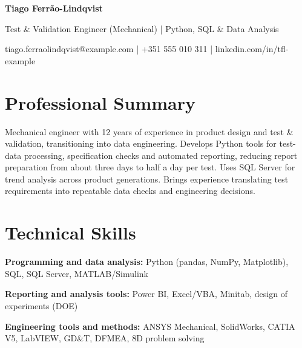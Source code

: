 \documentclass[11pt,a4paper]{article}
\newcommand{\cvsection}[1]{\section*{#1}}
\begin{document}
{\LARGE\bfseries\color{primarycolor} Tiago Ferrão-Lindqvist}\par
{\color{accentcolor}Test \& Validation Engineer (Mechanical) | Python, SQL \& Data Analysis}\par
{\small tiago.ferraolindqvist@example.com | +351 555 010 311 | linkedin.com/in/tfl-example}

\cvsection{Professional Summary}
Mechanical engineer with 12 years of experience in product design and test \& validation, transitioning into data engineering. Develops Python tools for test-data processing, specification checks and automated reporting, reducing report preparation from about three days to half a day per test. Uses SQL Server for trend analysis across product generations. Brings experience translating test requirements into repeatable data checks and engineering decisions.

\cvsection{Technical Skills}
\textbf{Programming and data analysis:} Python (pandas, NumPy, Matplotlib), SQL, SQL Server, MATLAB/Simulink\par
\textbf{Reporting and analysis tools:} Power BI, Excel/VBA, Minitab, design of experiments (DOE)\par
\textbf{Engineering tools and methods:} ANSYS Mechanical, SolidWorks, CATIA V5, LabVIEW, GD\&T, DFMEA, 8D problem solving
\end{document}
